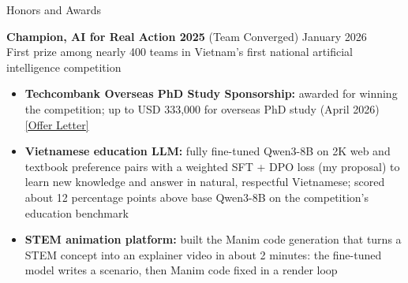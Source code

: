 \documentclass{resume} %
\begin{document}

\begin{rSection}{Honors and Awards}

\textbf{Champion, AI for Real Action 2025} (Team Converged)
\hfill January 2026\\
First prize among nearly 400 teams in Vietnam's first national artificial
intelligence competition

\begin{itemize}[leftmargin=1.5em,itemsep=0em,topsep=0.1em]
    \item \textbf{Techcombank Overseas PhD Study Sponsorship:} awarded for
    winning the competition; up to USD 333,000 for overseas PhD study
    (April 2026)
    \href{https://anhnh2002.github.io/Letter_of_Offer_N.H.Anh.pdf}{[Offer Letter]}
    \item \textbf{Vietnamese education LLM:} fully fine-tuned Qwen3-8B on 2K web
    and textbook preference pairs with a weighted SFT + DPO loss (my proposal) to
    learn new knowledge and answer in natural, respectful Vietnamese; scored about
    12 percentage points above base Qwen3-8B on the competition's education benchmark
    \item \textbf{STEM animation platform:} built the Manim code generation that
    turns a STEM concept into an explainer video in about 2 minutes: the fine-tuned
    model writes a scenario, then Manim code fixed in a render loop
\end{itemize}

\end{rSection}

\end{document}
